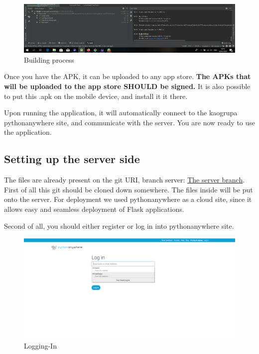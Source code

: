 			\begin{figure}[H]
				\includegraphics[width=\linewidth]{images/Deploy_M_5.png}
				\caption{Building process}
				\label{fig:install_5}
			\end{figure}
			
			Once you have the APK, it can be uploaded to any app store. \textbf{The APKs that will be uploaded to the app store SHOULD be signed.} It is also possible to put this .apk on the mobile device, and install it it there.
			
			Upon running the application, it will automatically connect to the kaogrupa pythonanywhere site, and communicate with the server. You are now ready to use the application.
			
			\subsection{Setting up the server side}
				
				The files are already present on the git URI, branch server: \href{https://gitlab.com/barbil/organization_of_the_festival/tree/server}{The server branch}. First of all this git should be cloned down somewhere. The files inside will be put onto the server. For deployment we used pythonanywhere as a cloud site, since it allows easy and seamless deployment of Flask applications.
				
				Second of all, you should either register or log in into pythonanywhere site.
				\begin{figure}[H]
					\includegraphics[width=\linewidth]{images/Deploy_1.png}
					\caption{Logging-In}
					\label{fig:deployment_1}
				\end{figure}
			
